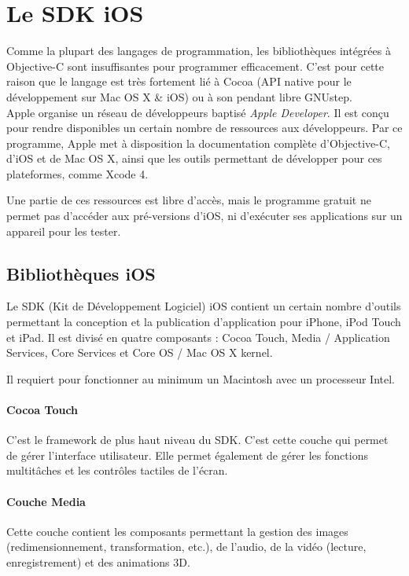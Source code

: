 \documentclass[11pt, french]{report}
\begin{document}
\section{Le SDK iOS}

Comme la plupart des langages de programmation, les bibliothèques intégrées à Objective-C sont insuffisantes pour programmer efficacement. C'est pour cette raison que le langage est très fortement lié à Cocoa (API native pour le développement sur Mac OS X \& iOS) ou à son pendant libre GNUstep.\\

Apple organise un réseau de développeurs baptisé \textit{Apple Developer}. Il est conçu pour rendre disponibles un certain nombre de ressources aux développeurs. Par ce programme, Apple met à disposition la documentation complète d'Objective-C, d'iOS et de Mac OS X, ainsi que les outils permettant de développer pour ces plateformes, comme Xcode 4.

Une partie de ces ressources est libre d'accès, mais le programme gratuit ne permet pas d'accéder aux pré-versions d'iOS, ni d'exécuter ses applications sur un appareil pour les tester.

\subsection{Bibliothèques iOS}

Le SDK (Kit de Développement Logiciel) iOS contient un certain nombre d'outils permettant la conception et la publication d'application pour iPhone, iPod Touch et iPad. Il est divisé en quatre composants : Cocoa Touch, Media / Application Services, Core Services et Core OS / Mac OS X kernel.

Il requiert pour fonctionner au minimum un Macintosh avec un processeur Intel.

\paragraph{Cocoa Touch} C'est le framework de plus haut niveau du SDK. C'est cette couche qui permet de gérer l'interface utilisateur. Elle permet également de gérer les fonctions multitâches et les contrôles tactiles de l'écran.

\paragraph{Couche Media} Cette couche contient les composants permettant la gestion des images (redimensionnement, transformation, etc.), de l'audio, de la vidéo (lecture, enregistrement) et des animations 3D.
\end{document}
